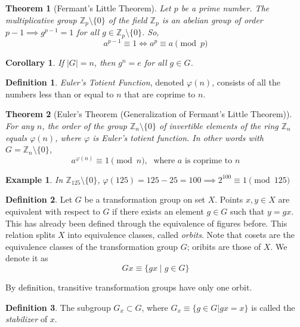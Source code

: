 \documentclass{article}
\newtheorem{theorem}{Theorem}[section]
\newtheorem{example}{Example}[section]
\newtheorem{corollary}{Corollary}[theorem]
\theoremstyle{remark}
\theoremstyle{definition}
\newtheorem{definition}{Definition}[section]
\begin{document}
\begin{theorem}[Fermant's Little Theorem]
Let $p$ be a prime number. The multiplicative group $\mathbb{Z}_{p} \setminus \{0\}$ of the field $\mathbb{Z}_{p}$ is an abelian group of order $p-1 \implies g^{p-1} = 1$ for all $g \in \mathbb{Z}_{p} \setminus \{0\}$. So,
\[ a^{p-1} \equiv 1 \iff a^{p} \equiv a \pmod{p} \]
\end{theorem}

\begin{corollary}
If $|G| = n$, then $g^{n} = e$ for all $g \in G$. 
\end{corollary}

\begin{definition}
\textit{Euler's Totient Function}, denoted $\varphi(n)$, consists of all the numbers less than or equal to $n$ that are coprime to $n$. 
\end{definition}

\begin{theorem}[Euler's Theorem (Generalization of Fermant's Little Theorem)]
For any $n$, the order of the group $\mathbb{Z}_{n} \setminus \{0\}$ of invertible elements of the ring $\mathbb{Z}_{n}$ equals $\varphi(n)$, where $\varphi$ is Euler's totient function. In other words with $G = \mathbb{Z}_{n} \setminus \{0\}$, 
\[ a^{\varphi(n)} \equiv 1 \pmod{n}, \; \text{ where $a$ is coprime to $n$}\]
\end{theorem}

\begin{example}
In $\mathbb{Z}_{125} \setminus \{0\}$, $\varphi(125) = 125 - 25 = 100 \implies 2^{100} \equiv 1 \pmod{125}$
\end{example}

\begin{definition}
Let $G$ be a transformation group on set $X$. Points $x, y \in X$ are equivalent with respect to $G$ if there exists an element $g \in G$ such that $y = g x$. This has already been defined through the equivalence of figures before. This relation splits $X$ into equivalence classes, called \textit{orbits}. Note that cosets are the equivalence classes of the transformation group $G$; oribits are those of $X$. We denote it as
\[ Gx \equiv \{ g x \;|\;g \in G \} \]
\end{definition}
By definition, transitive transformation groups have only one orbit.

\begin{definition}
The subgroup $G_{x} \subset G$, where $G_{x} \equiv \{ g \in G | g x = x\}$ is called the \textit{stabilizer} of $x$.
\end{definition}
\end{document}

